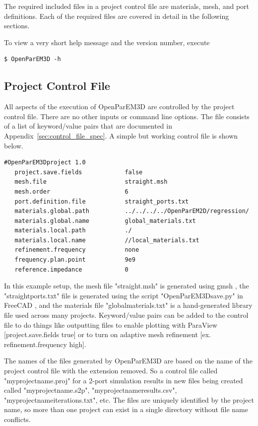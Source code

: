 \documentclass[titlepage]{article}
\renewcommand\_{\textunderscore\linebreak[1]}
\begin{document}
The required included files in a project control file are materials, mesh, and port definitions. Each of the required files are covered in detail in the following sections.

To view a very short help message and the version number, execute
\begin{Verbatim}[fontsize=\small]
   $ OpenParEM3D -h
\end{Verbatim}

\subsection{Project Control File}

All aspects of the execution of OpenParEM3D are controlled by the project control file.  There are no other inputs or command line options.  The file consists of a list of keyword/value pairs that are documented in Appendix~\ref{sec:control_file_spec}.  A simple but working control file is shown below.

\begin{Verbatim}[fontsize=\small]
   #OpenParEM3Dproject 1.0
   project.save.fields            false
   mesh.file                      straight.msh
   mesh.order                     6
   port.definition.file           straight_ports.txt
   materials.global.path          ../../../../OpenParEM2D/regression/
   materials.global.name          global_materials.txt
   materials.local.path           ./
   materials.local.name           //local_materials.txt
   refinement.frequency           none
   frequency.plan.point           9e9
   reference.impedance            0
\end{Verbatim}

\noindent In this example setup, the mesh file "straight.msh" is generated using gmsh \cite{gmsh}\cite{gmshweb}, the "straight\_ports.txt" file is generated using the script "OpenParEM3D\_save.py" in FreeCAD \cite{FreeCAD}, and the materials file "global\_materials.txt" is a hand-generated library file used across many projects.
Keyword/value pairs can be added to the control file to do things like outputting files to enable plotting with ParaView \cite{ParaView} [project.save.fields true] or to turn on adaptive mesh refinement [ex. refinement.frequency high].

The names of the files generated by OpenParEM3D are based on the name of the project control file with the extension removed.  So a control file called "my\_projectname.proj" for a 2-port simulation results in new files being created called "my\_projectname.s2p", "my\_projectname\_results.csv", "my\_projectname\_iterations.txt", etc.  The files are uniquely identified by the project name, so more than one project can exist in a single directory without file name conflicts.
\end{document}
